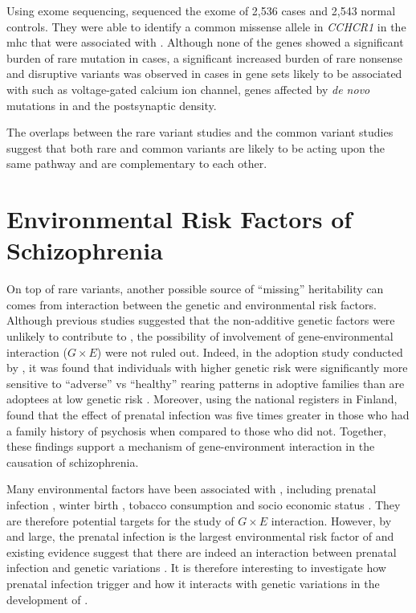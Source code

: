 	Using exome sequencing, \citet{Purcell2014} sequenced the exome of 2,536  cases and 2,543 normal controls. 
	They were able to identify a common missense allele in \textit{CCHCR1} in the \gls{mhc} that were associated with .
	Although none of the genes showed a significant burden of rare mutation in cases, a significant increased burden of rare nonsense and disruptive variants was observed in cases in gene sets likely to be associated with  such as voltage-gated calcium ion channel, genes affected by \textit{de novo} mutations in  \citep{Fromer2014} and the postsynaptic density.

	The overlaps between the rare variant studies and the common variant studies suggest that both rare and common variants are likely to be acting upon the same pathway and are complementary to each other.
	
	\section{Environmental Risk Factors of Schizophrenia}
	On top of rare variants, another possible source of ``missing'' heritability can comes from interaction between the genetic and environmental risk factors.
	Although previous studies \citep{Gottesman01071967} suggested that the non-additive genetic factors were unlikely to contribute to , the possibility of involvement of gene-environmental interaction ($G\times E$) were not ruled out.
	Indeed, in the adoption study conducted by \citet{Tienari2004}, it was found that individuals with higher genetic risk were significantly more sensitive to ``adverse'' vs ``healthy'' rearing patterns in adoptive families than are adoptees at low genetic risk \citep{Tienari2004}.
	Moreover, using the national registers in Finland, \citet{Clarke2009} found that the effect of prenatal infection was five times greater in those who had a family history of psychosis when compared to those who did not. 
	Together, these findings support a mechanism of gene-environment interaction in the causation of schizophrenia.
	
	Many environmental factors have been associated with , including prenatal infection \citep{Brown2010}, winter birth \citep{OCallaghan1991}, tobacco consumption \citep{Kelly1999} and socio economic status \citep{McGrath2008a}.
	They are therefore potential targets for the study of $G\times E$ interaction.
	However, by and large, the prenatal infection is the largest environmental risk factor of  and existing evidence suggest that there are indeed an interaction between prenatal infection and genetic variations \citep{Clarke2009}.
	It is therefore interesting to investigate how prenatal infection trigger  and how it interacts with genetic variations in the development of .	
	
